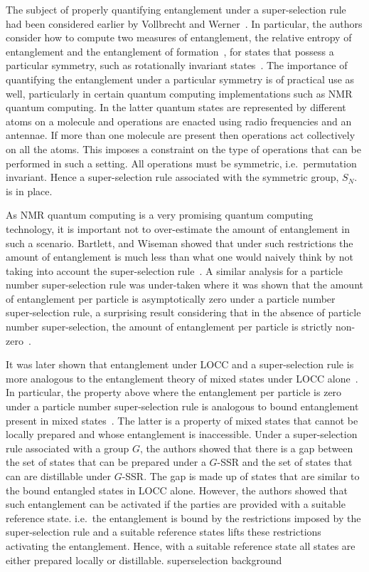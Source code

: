 \documentclass{article}
\begin{document}
The subject of properly quantifying entanglement under a super-selection rule had been considered earlier by Vollbrecht and Werner~\cite{VW01}.  In particular, the authors consider how to compute two measures of entanglement, the relative entropy of entanglement and the entanglement of formation~\cite{BDSW96}, for states that possess a particular symmetry, such as rotationally invariant states~\cite{W89}.  The importance of quantifying the entanglement under a particular symmetry is of practical use as well, particularly in certain quantum computing implementations such as NMR quantum computing.  In the latter quantum states are represented by different atoms on a molecule and operations are enacted using radio frequencies and an antennae.  If more than one molecule are present then operations act collectively on all the atoms.  This imposes a constraint on the type of operations that can be performed in such a setting.  All operations must be symmetric, i.e.~permutation invariant.  Hence a super-selection rule associated with the symmetric group, $S_N$. is in place.  

As NMR quantum computing is a very promising quantum computing technology, it is important not to over-estimate the amount of entanglement in such a scenario.  Bartlett, and Wiseman showed that under such restrictions the amount of entanglement is much less than what one would naively think by not taking into account the super-selection rule~\cite{BW03, WBV03}.  A similar analysis for a particle number super-selection rule was under-taken where it was shown that the amount of entanglement per particle is asymptotically zero under a particle number super-selection rule, a surprising result considering that in the absence of particle number super-selection, the amount of entanglement per particle is strictly non-zero~\cite{WV03,WBV03}.     

It was later shown that entanglement under LOCC and a super-selection rule is more analogous to the entanglement theory of mixed states under LOCC alone~\cite{BDSW06,JWBVP06}.  In particular, the property above where the entanglement per particle is zero under a particle number super-selection rule is analogous to bound entanglement present in mixed states~\cite{HHH98}.  The latter is a property of mixed states that cannot be locally prepared and whose entanglement is inaccessible.  Under a super-selection rule associated with a group $G$, the authors showed that there is a gap between the set of states that can be prepared under a $G$-SSR and the set of states that can are distillable under $G$-SSR.  The gap is made up of states that are similar to the bound entangled states in LOCC alone.  However, the authors showed that such entanglement can be activated if the parties are provided with a suitable reference state. i.e.~the entanglement is bound by the restrictions imposed by the super-selection rule and a suitable reference states lifts these restrictions activating the entanglement.  Hence, with a suitable reference state all states are either prepared locally or distillable.   superselection background
 
\end{document}
